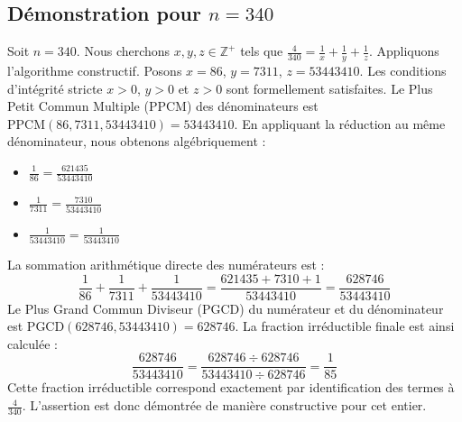 \documentclass[11pt,a4paper]{article}
\begin{document}
\subsection{Démonstration pour $n = 340$}
Soit $n = 340$. Nous cherchons $x, y, z \in \mathbb{Z}^{+}$ tels que $\frac{4}{340} = \frac{1}{x} + \frac{1}{y} + \frac{1}{z}$.
Appliquons l'algorithme constructif. Posons $x = 86$, $y = 7311$, $z = 53443410$.
Les conditions d'intégrité stricte $x > 0$, $y > 0$ et $z > 0$ sont formellement satisfaites.
Le Plus Petit Commun Multiple (PPCM) des dénominateurs est $\text{PPCM}(86, 7311, 53443410) = 53443410$.
En appliquant la réduction au même dénominateur, nous obtenons algébriquement :
\begin{itemize}
    \item $\frac{1}{86} = \frac{621435}{53443410}$
    \item $\frac{1}{7311} = \frac{7310}{53443410}$
    \item $\frac{1}{53443410} = \frac{1}{53443410}$
\end{itemize}
La sommation arithmétique directe des numérateurs est :
$$ \frac{1}{86} + \frac{1}{7311} + \frac{1}{53443410} = \frac{621435 + 7310 + 1}{53443410} = \frac{628746}{53443410} $$
Le Plus Grand Commun Diviseur (PGCD) du numérateur et du dénominateur est $\text{PGCD}(628746, 53443410) = 628746$.
La fraction irréductible finale est ainsi calculée :
$$ \frac{628746}{53443410} = \frac{628746 \div 628746}{53443410 \div 628746} = \frac{1}{85} $$
Cette fraction irréductible correspond exactement par identification des termes à $\frac{4}{340}$. L'assertion est donc démontrée de manière constructive pour cet entier.
\end{document}
